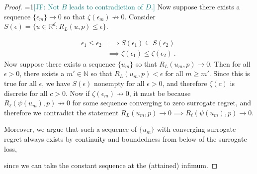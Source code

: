 \documentclass{article} %
\newcommand{\Comments}{0}
\newcommand{\mynote}[2]{\ifnum\Comments=1\textcolor{#1}{#2}\fi}
\newcommand{\mytodo}[2]{\ifnum\Comments=1%
	\todo[linecolor=#1!80!black,backgroundcolor=#1,bordercolor=#1!80!black]{#2}\fi}
\newcommand{\jessie}[1]{\mynote{teal}{[JF: #1]}}
\newcommand{\jessiet}[1]{\mytodo{teal!20!white}{JF: #1}}
\newcommand{\btw}[1]{}%
\newcommand{\reals}{\mathbb{R}}
\newcommand{\simplex}{\Delta_\Y}
\newcommand{\Y}{\mathcal{Y}}
\begin{document}
\begin{proof}
\jessie{Not $B$ leads to contradiction of $D$.}
Now suppose there exists a sequence $\{\epsilon_m\} \to 0$ so that $\zeta(\epsilon_m) \not \to 0$.
Consider $S(\epsilon) = \{u \in \reals^d : R_L(u,p) \leq \epsilon\}$.

\begin{align*}
\epsilon_1 \leq \epsilon_2 &\implies S(\epsilon_1) \subseteq S(\epsilon_2)\\
&\implies \zeta(\epsilon_1) \leq \zeta(\epsilon_2)~.~
\end{align*}
Now suppose there exists a sequence $\{u_m\}$ so that $R_L(u_m, p) \to 0$.
Then for all $\epsilon > 0$, there exists a $m' \in \mathbb{N}$ so that $R_L(u_m, p) < \epsilon$ for all $m \geq m'$.
Since this is true for all $\epsilon$, we have $S(\epsilon)$ nonempty for all $\epsilon > 0$, and therefore $\zeta(c)$ is discrete for all $c > 0$.
Now if $\zeta(\epsilon_m) \not \to 0$, it must be because $R_\ell(\psi(u_m), p) \not \to 0$ for some sequence converging to zero surrogate regret, and therefore we contradict the statement $R_L(u_m, p) \to 0 \implies R_\ell(\psi(u_m), p) \to 0$.

Moreover, we argue that such a sequence of $\{u_m\}$ with converging surrogate regret always exists by continuity and boundedness from below of the surrogate loss,
\btw{really just need lower semi-continuity and boundedness from below}
since we can take the constant sequence at the (attained) infimum.
%
%	
\end{proof}
\end{document}
